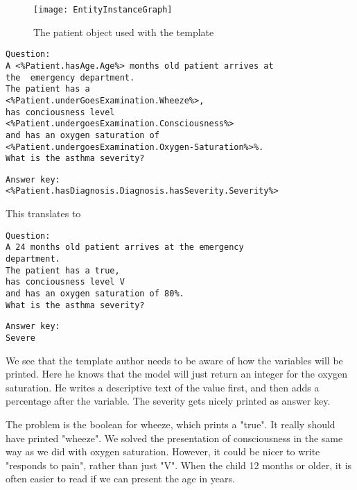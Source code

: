 \begin{figure}[h!]
	\texttt{[image: EntityInstanceGraph]}
	\caption {The patient object used with the template}
	\label{fig:EntityInstanceGraph}
\end{figure}

\begin{lstlisting}[caption={Question template}, frame=single, captionpos=b] 
Question:
A <%Patient.hasAge.Age%> months old patient arrives at 
the  emergency department. 
The patient has a 
<%Patient.underGoesExamination.Wheeze%>,
has conciousness level 
<%Patient.undergoesExamination.Consciousness%> 
and has an oxygen saturation of 
<%Patient.undergoesExamination.Oxygen-Saturation%>%. 
What is the asthma severity? 
\end{lstlisting}

\begin{lstlisting}[caption={Answer key template}, frame=single, captionpos=b] 
Answer key:
<%Patient.hasDiagnosis.Diagnosis.hasSeverity.Severity%>
\end{lstlisting}

This translates to 
\begin{lstlisting}[caption={Question instantiation}, frame=single, captionpos=b] 
Question:
A 24 months old patient arrives at the emergency 
department. 
The patient has a true,
has conciousness level V 
and has an oxygen saturation of 80%. 
What is the asthma severity? 
\end{lstlisting}

\begin{lstlisting}[caption={Answer key template}, frame=single, captionpos=b] 
Answer key:
Severe
\end{lstlisting}

We see that the template author needs to be aware of how the variables will be printed. Here he knows that the model will just return an integer for the oxygen saturation. He writes a descriptive text of the value first, and then adds a percentage after the variable. The severity gets nicely printed as answer key.

The problem is the boolean for wheeze, which prints a "true". It really should have printed "wheeze". We solved the presentation of consciousness in the same way as we did with oxygen saturation. However, it could be nicer to write "responds to pain", rather than just "V". When the child 12 months or older, it is often easier to read if we can present the age in years.

